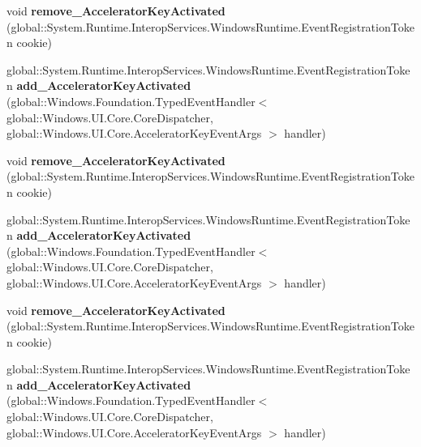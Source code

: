 \begin{DoxyCompactItemize}
void {\bfseries remove\+\_\+\+Accelerator\+Key\+Activated} (global\+::\+System.\+Runtime.\+Interop\+Services.\+Windows\+Runtime.\+Event\+Registration\+Token cookie)
\item 
\mbox{\label{interface_windows_1_1_u_i_1_1_core_1_1_i_core_accelerator_keys_a8b6129e73c788f400dd51e57d155e12e}} 
global\+::\+System.\+Runtime.\+Interop\+Services.\+Windows\+Runtime.\+Event\+Registration\+Token {\bfseries add\+\_\+\+Accelerator\+Key\+Activated} (global\+::\+Windows.\+Foundation.\+Typed\+Event\+Handler$<$ global\+::\+Windows.\+U\+I.\+Core.\+Core\+Dispatcher, global\+::\+Windows.\+U\+I.\+Core.\+Accelerator\+Key\+Event\+Args $>$ handler)
\item 
\mbox{\label{interface_windows_1_1_u_i_1_1_core_1_1_i_core_accelerator_keys_a821215fbccaab1a96d172dfa425ebdaf}} 
void {\bfseries remove\+\_\+\+Accelerator\+Key\+Activated} (global\+::\+System.\+Runtime.\+Interop\+Services.\+Windows\+Runtime.\+Event\+Registration\+Token cookie)
\item 
\mbox{\label{interface_windows_1_1_u_i_1_1_core_1_1_i_core_accelerator_keys_a8b6129e73c788f400dd51e57d155e12e}} 
global\+::\+System.\+Runtime.\+Interop\+Services.\+Windows\+Runtime.\+Event\+Registration\+Token {\bfseries add\+\_\+\+Accelerator\+Key\+Activated} (global\+::\+Windows.\+Foundation.\+Typed\+Event\+Handler$<$ global\+::\+Windows.\+U\+I.\+Core.\+Core\+Dispatcher, global\+::\+Windows.\+U\+I.\+Core.\+Accelerator\+Key\+Event\+Args $>$ handler)
\item 
\mbox{\label{interface_windows_1_1_u_i_1_1_core_1_1_i_core_accelerator_keys_a821215fbccaab1a96d172dfa425ebdaf}} 
void {\bfseries remove\+\_\+\+Accelerator\+Key\+Activated} (global\+::\+System.\+Runtime.\+Interop\+Services.\+Windows\+Runtime.\+Event\+Registration\+Token cookie)
\item 
\mbox{\label{interface_windows_1_1_u_i_1_1_core_1_1_i_core_accelerator_keys_a8b6129e73c788f400dd51e57d155e12e}} 
global\+::\+System.\+Runtime.\+Interop\+Services.\+Windows\+Runtime.\+Event\+Registration\+Token {\bfseries add\+\_\+\+Accelerator\+Key\+Activated} (global\+::\+Windows.\+Foundation.\+Typed\+Event\+Handler$<$ global\+::\+Windows.\+U\+I.\+Core.\+Core\+Dispatcher, global\+::\+Windows.\+U\+I.\+Core.\+Accelerator\+Key\+Event\+Args $>$ handler)

\end{DoxyCompactItemize}
